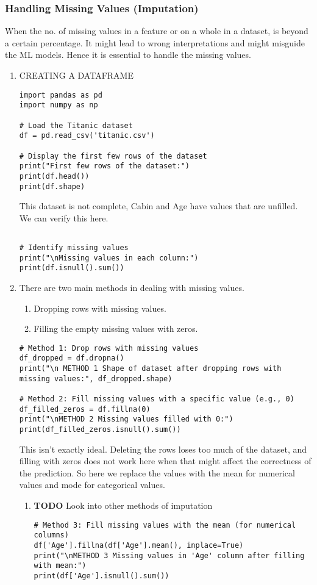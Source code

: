 \documentclass[11pt]{article}
\begin{document}
\subsubsection{Handling Missing Values (Imputation)}
\label{sec:orgbb9d1a2}
When the no. of missing values in a feature or on a whole in a dataset, is beyond a certain percentage. It might lead to wrong interpretations and might misguide the ML models.
Hence it is essential to handle the missing values.
\begin{enumerate}
\item CREATING A DATAFRAME
\label{sec:org9f2a8e9}
\begin{verbatim}
import pandas as pd
import numpy as np

# Load the Titanic dataset
df = pd.read_csv('titanic.csv')

# Display the first few rows of the dataset
print("First few rows of the dataset:")
print(df.head())
print(df.shape)
\end{verbatim}
This dataset is not complete, Cabin and Age have values that are unfilled. We can verify this here.
\begin{verbatim}

# Identify missing values
print("\nMissing values in each column:")
print(df.isnull().sum())

\end{verbatim}
\item There are two main methods in dealing with missing values.
\label{sec:org8fc0ba3}
\begin{enumerate}
\item Dropping rows with missing values.
\item Filling the empty missing values with zeros.
\end{enumerate}
\begin{verbatim}
# Method 1: Drop rows with missing values
df_dropped = df.dropna()
print("\n METHOD 1 Shape of dataset after dropping rows with missing values:", df_dropped.shape)

# Method 2: Fill missing values with a specific value (e.g., 0)
df_filled_zeros = df.fillna(0)
print("\nMETHOD 2 Missing values filled with 0:")
print(df_filled_zeros.isnull().sum())

\end{verbatim}

This isn't exactly ideal. Deleting the rows loses too  much of the dataset, and filling with zeros does not work here when that might affect the correctness of the prediction.
So here we replace the values with the mean for numerical values and mode for categorical values.
\begin{enumerate}
\item {\bfseries\sffamily TODO} Look into other methods of imputation
\label{sec:orgd55def3}
\begin{verbatim}
# Method 3: Fill missing values with the mean (for numerical columns)
df['Age'].fillna(df['Age'].mean(), inplace=True)
print("\nMETHOD 3 Missing values in 'Age' column after filling with mean:")
print(df['Age'].isnull().sum())


\end{verbatim}
\end{enumerate}
\end{enumerate}
\end{document}
